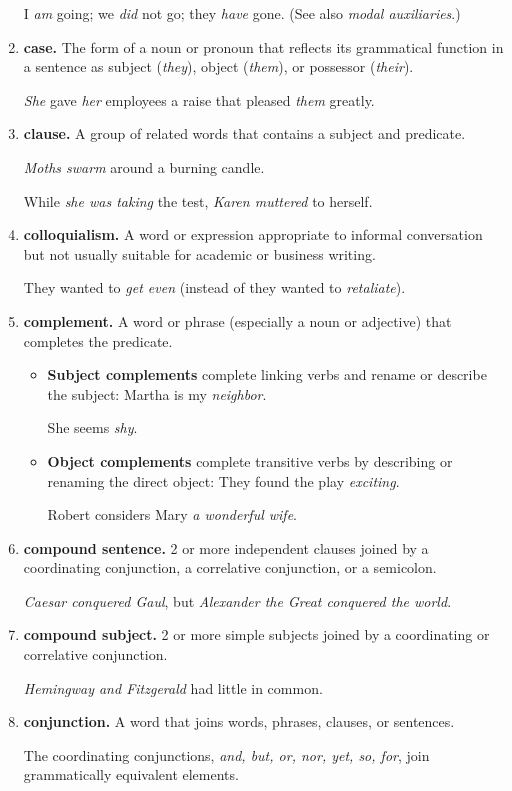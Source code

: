 \documentclass{article}
\begin{document}
\begin{enumerate}
	I {\it am} going; we {\it did} not go; they {\it have} gone. (See also {\it modal auxiliaries}.)
	\item {\bf case.} The form of a noun or pronoun that reflects its grammatical function in a sentence as subject ({\it they}), object ({\it them}), or possessor ({\it their}).
	
	{\it She} gave {\it her} employees a raise that pleased {\it them} greatly.
	\item {\bf clause.} A group of related words that contains a subject and predicate.
	
	{\it Moths swarm} around a burning candle.
	
	While {\it she was taking} the test, {\it Karen muttered} to herself.
	\item {\bf colloquialism.} A word or expression appropriate to informal conversation but not usually suitable for academic or business writing.
	
	They wanted to {\it get even} (instead of they wanted to {\it retaliate}).
	\item {\bf complement.} A word or phrase (especially a noun or adjective) that completes the predicate.
	\begin{itemize}
		\item {\bf Subject complements} complete linking verbs and rename or describe the subject: Martha is my {\it neighbor}.
		
		She seems {\it shy}.
		\item {\bf Object complements} complete transitive verbs by describing or renaming the direct object: They found the play {\it exciting}.
		
		Robert considers Mary {\it a wonderful wife}.
	\end{itemize}
	\item {\bf compound sentence.} 2 or more independent clauses joined by a coordinating conjunction, a correlative conjunction, or a semicolon.
	
	{\it Caesar conquered Gaul}, but {\it Alexander the Great conquered the world}.
	\item {\bf compound subject.} 2 or more simple subjects joined by a coordinating or correlative conjunction.
	
	{\it Hemingway and Fitzgerald} had little in common.
	\item {\bf conjunction.} A word that joins words, phrases, clauses, or sentences.
	
	The coordinating conjunctions, {\it and, but, or, nor, yet, so, for}, join grammatically equivalent elements.
	

\end{enumerate}
\end{document}
